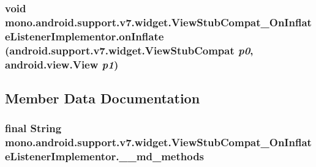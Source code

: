 \hypertarget{classmono_1_1android_1_1support_1_1v7_1_1widget_1_1_view_stub_compat___on_inflate_listener_implementor_f5dd2c498ef67b36825b1c2071bf528f}{
\subsubsection[{onInflate}]{\setlength{\rightskip}{0pt plus 5cm}void mono.android.support.v7.widget.ViewStubCompat\_\-OnInflateListenerImplementor.onInflate (android.support.v7.widget.ViewStubCompat {\em p0}, \/  android.view.View {\em p1})}}
\label{classmono_1_1android_1_1support_1_1v7_1_1widget_1_1_view_stub_compat___on_inflate_listener_implementor_f5dd2c498ef67b36825b1c2071bf528f}




\subsection{Member Data Documentation}
\hypertarget{classmono_1_1android_1_1support_1_1v7_1_1widget_1_1_view_stub_compat___on_inflate_listener_implementor_75afa2a9c0ea491c4b7e56d95f3cbfcb}{
\subsubsection[{\_\-\_\-md\_\-methods}]{\setlength{\rightskip}{0pt plus 5cm}final String {\bf mono.android.support.v7.widget.ViewStubCompat\_\-OnInflateListenerImplementor.\_\-\_\-md\_\-methods}}}
\label{classmono_1_1android_1_1support_1_1v7_1_1widget_1_1_view_stub_compat___on_inflate_listener_implementor_75afa2a9c0ea491c4b7e56d95f3cbfcb}


